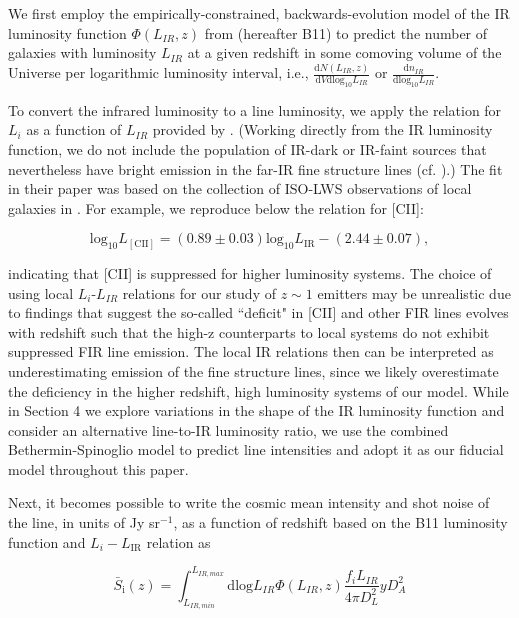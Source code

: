 \documentclass[iop]{emulateapj}
\begin{document}
We first employ the empirically-constrained, backwards-evolution model of the IR luminosity function $\Phi(L_{IR}, z)$ from \citet{bethermin11} (hereafter B11) to predict the number of galaxies with luminosity $L_{IR}$ at a given redshift in some comoving volume of the Universe per logarithmic luminosity interval, i.e., $\frac{\mathrm{d}N(L_{IR},z)}{\mathrm{d}V\mathrm{dlog_{10}}L_{IR}}$ or $\frac{\mathrm{d}n_{IR}}{\mathrm{dlog_{10}}L_{IR}}$.

To convert the infrared luminosity to a line luminosity, we apply the relation for $L_{i}$ as a function of $L_{IR}$ provided by \citet{spinoglio12}. (Working directly from the IR luminosity function, we do not include the population of IR-dark or IR-faint sources that nevertheless have bright emission in the far-IR fine structure lines (cf. \citet{Riechers14}).) The fit in their paper was based on the collection of ISO-LWS observations of local galaxies in \citet{brauher08}. For example, we reproduce below the relation for [CII]:

\begin{equation}
\mathrm{log_{10}}L_{\mathrm{[CII]}} = (0.89 \pm 0.03) \mathrm{log_{10}}L_{\mathrm{IR}} - (2.44 \pm 0.07),
\end{equation}

indicating that [CII] is suppressed for higher luminosity systems. The choice of using local $L_i$-$L_{IR}$ relations for our study of $z\sim1$ emitters may be unrealistic due to findings that suggest the so-called ``deficit" in [CII] and other FIR lines evolves with redshift such that the high-z counterparts to local systems do not exhibit suppressed FIR line emission. The local IR relations then can be interpreted as underestimating emission of the fine structure lines, since we likely overestimate the deficiency in the higher redshift, high luminosity systems of our model. While in Section 4 we explore variations in the shape of the IR luminosity function and consider an alternative line-to-IR luminosity ratio, we use the combined Bethermin-Spinoglio model to predict line intensities and adopt it as our fiducial model throughout this paper. 

Next, it becomes possible to write the cosmic mean intensity and shot noise of the line, in units of Jy sr$^{-1}$,  as a function of redshift based on the B11 luminosity function and \citet{spinoglio12} $L_{i}-L_{\mathrm{IR}}$ relation as

\begin{equation} \label{eq:intensity}
\bar{S}_{\mathrm{i}}(z) = \int_{L_{IR,min}}^{L_{IR,max}} \mathrm{dlog}L_{IR}  \Phi(L_{IR}, z) \frac{f_{i} L_{IR} }{4 \pi D_{L}^2} y D_A^2
\end{equation}
\end{document}

